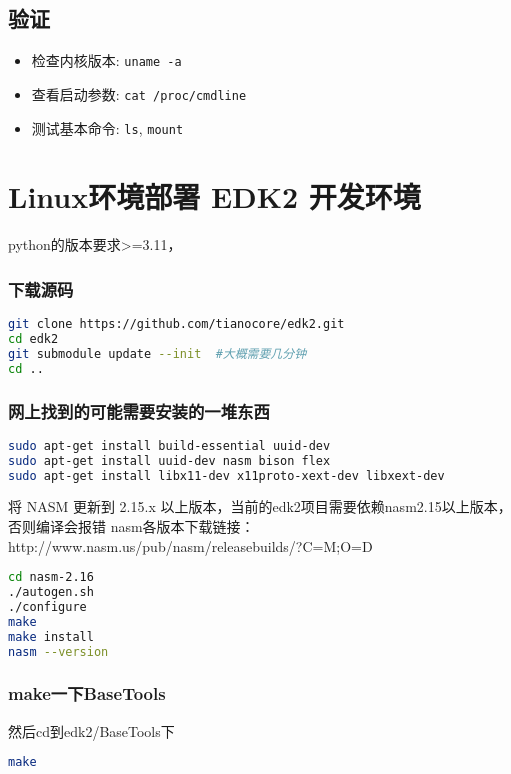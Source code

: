 \subsection{验证}
\begin{itemize}
    \item 检查内核版本: \texttt{uname -a}
    \item 查看启动参数: \texttt{cat /proc/cmdline}
    \item 测试基本命令: \texttt{ls}, \texttt{mount}
\end{itemize}

\section{Linux环境部署 EDK2 开发环境}

python的版本要求>=3.11，

\subsubsection{下载源码}
\begin{lstlisting}[language=bash]
git clone https://github.com/tianocore/edk2.git
cd edk2
git submodule update --init  #大概需要几分钟
cd ..
\end{lstlisting}

\subsubsection{网上找到的可能需要安装的一堆东西}
\begin{lstlisting}[language=bash]
sudo apt-get install build-essential uuid-dev
sudo apt-get install uuid-dev nasm bison flex
sudo apt-get install libx11-dev x11proto-xext-dev libxext-dev
\end{lstlisting}

将 NASM 更新到 2.15.x 以上版本，当前的edk2项目需要依赖nasm2.15以上版本，否则编译会报错
nasm各版本下载链接：http://www.nasm.us/pub/nasm/releasebuilds/?C=M;O=D

\begin{lstlisting}[language=bash]
cd nasm-2.16
./autogen.sh
./configure
make
make install
nasm --version
\end{lstlisting}

\subsubsection{make一下BaseTools}

然后cd到edk2/BaseTools下
\begin{lstlisting}[language=bash]
make
\end{lstlisting}

